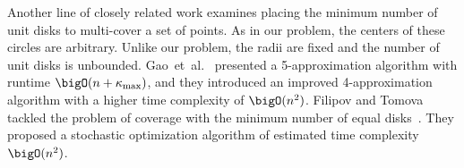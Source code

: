 Another line of closely related work examines placing the minimum number of unit disks to multi-cover a set of points.
As in our problem, the centers of these circles are arbitrary.
Unlike our problem, the radii are fixed and the number of unit disks is unbounded.
Gao~et~al.~\cite{gao2022fast} presented a 5-approximation algorithm with runtime $\bigO(n + \kappa_\text{max})$, and they introduced an improved 4-approximation algorithm with a higher time complexity of $\bigO(n^2)$. 
Filipov and Tomova tackled the problem of coverage with the minimum number of equal disks~\cite{Georgiev2023}.
They proposed a stochastic optimization algorithm of estimated time complexity $\bigO(n^2)$.
